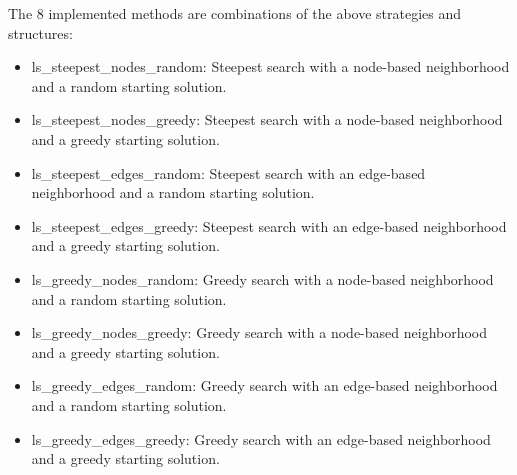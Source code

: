 The 8 implemented methods are combinations of the above strategies and structures:

\begin{itemize}
    \item ls\_steepest\_nodes\_random: Steepest search with a node-based neighborhood and a random starting solution.
    \item ls\_steepest\_nodes\_greedy: Steepest search with a node-based neighborhood and a greedy starting solution.
    \item ls\_steepest\_edges\_random: Steepest search with an edge-based neighborhood and a random starting solution.
    \item ls\_steepest\_edges\_greedy: Steepest search with an edge-based neighborhood and a greedy starting solution.
    \item ls\_greedy\_nodes\_random: Greedy search with a node-based neighborhood and a random starting solution.
    \item ls\_greedy\_nodes\_greedy: Greedy search with a node-based neighborhood and a greedy starting solution.
    \item ls\_greedy\_edges\_random: Greedy search with an edge-based neighborhood and a random starting solution.
    \item ls\_greedy\_edges\_greedy: Greedy search with an edge-based neighborhood and a greedy starting solution.
\end{itemize}